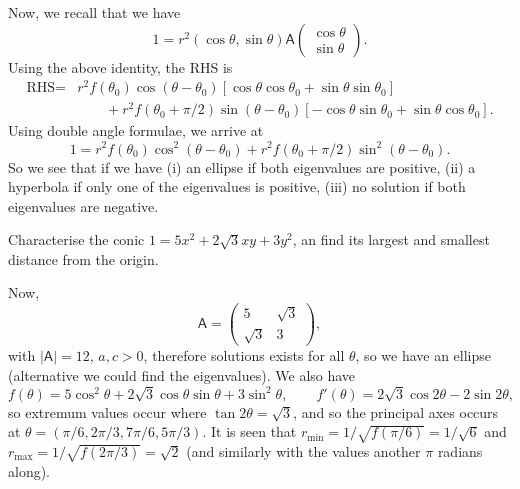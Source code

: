\documentclass[letter-paper]{tufte-book}
\newenvironment{example}[1][Example]{\begin{trivlist}
\item[\hskip \labelsep {\bfseries #1}]}{\end{trivlist}}
\begin{document}
Now, we recall that we have
\begin{equation*}
	1=r^2(\cos\theta,\sin\theta)\mathsf{A}
	\begin{pmatrix}\cos\theta \\ \sin\theta\end{pmatrix}.
\end{equation*}
Using the above identity, the RHS is
\begin{equation*}\begin{aligned}
	\mbox{RHS}=&r^2 f(\theta_0)\cos(\theta-\theta_0)
	[\cos\theta\cos\theta_0 + \sin\theta\sin\theta_0]\\
	&\qquad+ r^2 f(\theta_0+\pi/2)\sin(\theta-\theta_0)
	[-\cos\theta\sin\theta_0 + \sin\theta\cos\theta_0].
\end{aligned}\end{equation*}
Using double angle formulae, we arrive at
\begin{equation*}
	1=r^2 f(\theta_0)\cos^2(\theta-\theta_0) 
	+r^2 f(\theta_0+\pi/2)\sin^2(\theta-\theta_0).
\end{equation*}
So we see that if we have (i) an ellipse if both eigenvalues are positive, (ii)
a hyperbola if only one of the eigenvalues is positive, (iii) no solution if
both eigenvalues are negative.

\begin{example}
	Characterise the conic $1=5x^2 + 2\sqrt{3} xy + 3y^2$, an find its largest
	and smallest distance from the origin.
	
	Now,
	\begin{equation*}
		\mathsf{A}=\begin{pmatrix}5 & \sqrt{3}\\ \sqrt{3} & 3\end{pmatrix},
	\end{equation*}
	with $|\mathsf{A}|=12$, $a,c>0$, therefore solutions exists for all
	$\theta$, so we have an ellipse (alternative we could find the eigenvalues).
	We also have
	\begin{equation*}
	 	f(\theta)=5\cos^2\theta+2\sqrt{3}\cos\theta\sin\theta+3\sin^2\theta,
	 	\qquad
	 	f'(\theta)=2\sqrt{3}\cos2\theta-2\sin2\theta,
	 \end{equation*}
	 so extremum values occur where $\tan2\theta=\sqrt{3}$, and so the principal
	 axes occurs at $\theta=(\pi/6,2\pi/3,7\pi/6,5\pi/3)$. It is seen that
	 $r_{\min}=1/\sqrt{f(\pi/6)}=1/\sqrt{6}$ and
	 $r_{\max}=1/\sqrt{f(2\pi/3)}=\sqrt{2}$ (and similarly with the values
	 another $\pi$ radians along).
\end{example}
\end{document}
